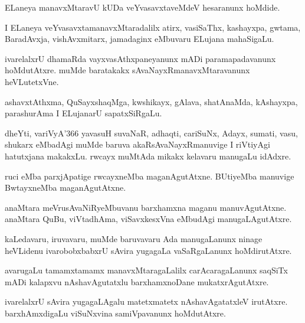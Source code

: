 \documentclass{article}
\begin{document}
\begin{mn}
ELaneya manavxMtaravU kUDa veYvasavxtaveMdeV hesaranunx hoMdide.
\end{mn}

\begin{mn}
I ELaneya veYvasavxtamanavxMtaradalilx atirx, vasiSaThx, kashayxpa,
gwtama, BaradAvxja, vishAvxmitarx, jamadaginx eMbuvaru ELujana mahaSigaLu.
\end{mn}

\begin{mn}
ivarelalxrU dhamaRda vayxvasAthxpaneyanunx mADi paramapadavanunx
hoMdutAtxre. muMde baratakakx sAvaNayxRmanavxMtaravanunx heVLutetxVne.
\end{mn}

\begin{mn}
ashavxtAthxma, QuSayxshaqMga, kwshikayx, gAlava, shatAnaMda,
kAshayxpa, parashurAma I ELujanarU sapatxSiRgaLu.
\end{mn}

\begin{mn}%
dheYti, variVyA\char'366 yavasuH suvaNaR, adhaqti, cariSuNx, Adayx,
sumati, vasu, shukarx eMbadAgi muMde baruva akaRsAvaNayxRmanuvige I
riVtiyAgi hatutxjana makakxLu. rwcayx muMtAda mikakx kelavaru manugaLu idAdxre.
\end{mn}

\begin{mn}%
ruci eMba parxjApatige rwcayxneMba maganAgutAtxne. BUtiyeMba manuvige
BwtayxneMba maganAgutAtxne.
\end{mn}

\begin{mn}
anaMtara meVrusAvaNiRyeMbuvanu barxhamxna maganu
manuvAgutAtxne. anaMtara QuBu, viVtadhAma, viSavxkesxVna eMbudAgi manugaLAgutAtxre.
\end{mn}

\begin{mn}
kaLedavaru, iruvavaru, muMde baruvavaru Ada manugaLanunx ninage
heVLidenu ivarobobxbabxrU sAvira yugagaLa vaSaRgaLanunx hoMdirutAtxre.
\end{mn}

\begin{mn}%
avarugaLu tamamxtamamx manavxMtaragaLalilx carAcaragaLanunx saqSiTx
mADi kalapxvu nAshavAgutatxlu barxhamxnoDane mukatxrAgutAtxre.
\end{mn}

\begin{mn}
ivarelalxrU sAvira yugagaLAgalu matetxmatetx nAshavAgatatxleV
irutAtxre. barxhAmxdigaLu viSuNxvina samiVpavanunx hoMdutAtxre.
\end{mn}
\end{document}
